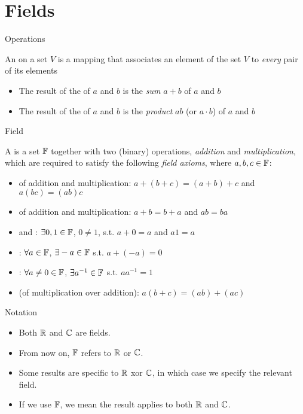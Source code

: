 \documentclass[aspectratio=169]{beamer}
\begin{document}
\section{Fields}

\begin{frame}{Operations}
\begin{definition}
An  on a set $V$ is a mapping that associates an element of the set $V$ to \emph{every} pair of its elements
\begin{itemize}
\item The result of the  of $a$ and $b$ is the \emph{sum} $a+b$ of $a$ and $b$
\item The result of the  of $a$ and $b$ is the \emph{product} $ab$ (or $a\cdot b$) of $a$ and $b$
\end{itemize}
\end{definition}
\end{frame}

\begin{frame}{Field}
\begin{definition}[Field]
A  is a set $\mathbb{F}$ together with two (binary) operations, \emph{addition} and \emph{multiplication}, which are required to satisfy the following \emph{field axioms}, where $a,b,c\in\mathbb{F}$:
\begin{itemize}
\item {} of addition and multiplication: $a+(b+c)=(a+b)+c$ and $a(bc)=(ab)c$
\item {} of addition and multiplication: $a+b=b+a$ and $ab=ba$
\item {} and : $\exists 0,1\in\mathbb{F}$, $0\neq 1$, s.t. $a+0=a$ and $a1=a$
\item {}: $\forall a\in\mathbb{F}$, $\exists -a\in\mathbb{F}$ s.t. $a+(-a)=0$
\item {}: $\forall a\neq 0\in\mathbb{F}$, $\exists a^{-1}\in\mathbb{F}$ s.t. $aa^{-1}=1$
\item {} (of multiplication over addition): $a(b+c)=(ab)+(ac)$
\end{itemize}
\end{definition}
\end{frame}


\begin{frame}{Notation}
\begin{itemize}
    \item Both $\mathbb{R}$ and $\mathbb{C}$ are fields.
    \item From now on, $\mathbb{F}$ refers to $\mathbb{R}$ or $\mathbb{C}$.
    \item Some results are specific to $\mathbb{R}$ xor $\mathbb{C}$, in which case we specify the relevant field.
    \item If we use $\mathbb{F}$, we mean the result applies to both $\mathbb{R}$ and $\mathbb{C}$.
\end{itemize}
\end{frame}
\end{document}

